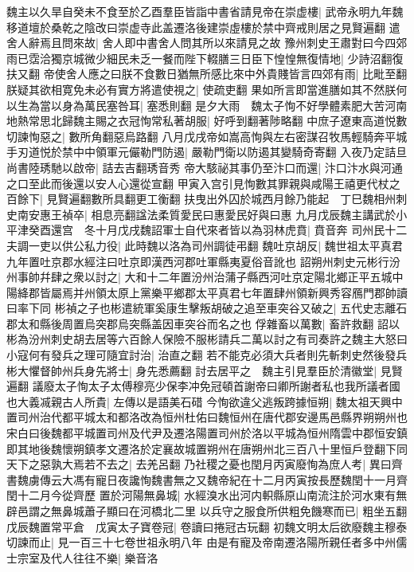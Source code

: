 魏主以久旱自癸未不食至於乙酉羣臣皆詣中書省請見帝在崇虚樓|{
	武帝永明九年魏移道壇於桑乾之陰改曰崇虚寺此盖遷洛後建崇虛樓於禁中齊戒則居之見賢遍翻}
遣舍人辭焉且問來故|{
	舍人即中書舍人問其所以來請見之故}
豫州刺史王肅對曰今四郊雨已霑洽獨京城微少細民未乏一餐而陛下輟膳三日臣下惶惶無復情地|{
	少詩沼翻復扶又翻}
帝使舍人應之曰朕不食數日猶無所感比來中外貴賤皆言四郊有雨|{
	比毗至翻}
朕疑其欲相寛免未必有實方將遣使視之|{
	使疏吏翻}
果如所言即當進膳如其不然朕何以生為當以身為萬民塞咎耳|{
	塞悉則翻}
是夕大雨　魏太子恂不好學體素肥大苦河南地熱常思北歸魏主賜之衣冠恂常私著胡服|{
	好呼到翻著陟略翻}
中庶子遼東高道悦數切諫恂惡之|{
	數所角翻惡烏路翻}
八月戊戌帝如嵩高恂與左右密謀召牧馬輕騎奔平城手刃道悦於禁中中領軍元儼勒門防遏|{
	嚴勒門衛以防遏其變騎奇寄翻}
入夜乃定詰旦尚書陸琇馳以啟帝|{
	詰去吉翻琇音秀}
帝大駭祕其事仍至汴口而還|{
	汴口汴水與河通之口至此而後還以安人心還從宣翻}
甲寅入宫引見恂數其罪親與咸陽王禧更代杖之百餘下|{
	見賢遍翻數所具翻更工衡翻}
扶曳出外囚於城西月餘乃能起　丁巳魏相州刺史南安惠王禎卒|{
	相息亮翻諡法柔質愛民曰惠愛民好與曰惠}
九月戊辰魏主講武於小平津癸酉還宫　冬十月戊戌魏詔軍士自代來者皆以為羽林虎賁|{
	賁音奔}
司州民十二夫調一吏以供公私力役|{
	此時魏以洛為司州調徒弔翻}
魏吐京胡反|{
	魏世祖太平真君九年置吐京郡水經注曰吐京即漢西河郡吐軍縣夷夏俗音訛也}
詔朔州刺史元彬行汾州事帥幷肆之衆以討之|{
	大和十二年置汾州治蒲子縣西河吐京定陽北鄉正平五城中陽絳郡皆屬焉并州領太原上黨樂平鄉郡太平真君七年置肆州領新興秀容鴈門郡帥讀曰率下同}
彬禎之子也彬遣統軍奚康生擊叛胡破之追至車突谷又破之|{
	五代史志離石郡太和縣後周置烏突郡烏突縣盖因車突谷而名之也}
俘雜畜以萬數|{
	畜許救翻}
詔以彬為汾州刺史胡去居等六百餘人保險不服彬請兵二萬以討之有司奏許之魏主大怒曰小寇何有發兵之理可隨宜討治|{
	治直之翻}
若不能克必須大兵者則先斬刺史然後發兵彬大懼督帥州兵身先將士|{
	身先悉薦翻}
討去居平之　魏主引見羣臣於清徽堂|{
	見賢遍翻}
議廢太子恂太子太傅穆亮少保李冲免冠頓首謝帝曰卿所謝者私也我所議者國也大義㓕親古人所貴|{
	左傳以是語美石碏}
今恂欲違父逃叛跨據恒朔|{
	魏太祖天興中置司州治代都平城太和都洛改為恒州杜佑曰魏恒州在唐代郡安邊馬邑縣界朔朔州也宋白曰後魏都平城置司州及代尹及遷洛陽置司州於洛以平城為恒州隋雲中郡恒安鎮即其地後魏懷朔鎮孝文遷洛於定襄故城置朔州在唐朔州北三百八十里恒戶登翻下同}
天下之惡孰大焉若不去之|{
	去羌呂翻}
乃社稷之憂也閏月丙寅廢恂為庶人考|{
	異曰齊書魏虜傳云大馮有寵日夜讒恂魏書無之又魏帝紀在十二月丙寅按長歷魏閏十一月齊閏十二月今從齊歷}
置於河陽無鼻城|{
	水經溴水出河内軹縣原山南流注於河水東有無辟邑謂之無鼻城蕭子顯曰在河橋北二里}
以兵守之服食所供粗免饑寒而已|{
	粗坐五翻}
戊辰魏置常平倉　戊寅太子寶卷冠|{
	卷讀曰捲冠古玩翻}
初魏文明太后欲廢魏主穆泰切諫而止|{
	見一百三十七卷世祖永明八年}
由是有寵及帝南遷洛陽所親任者多中州儒士宗室及代人往往不樂|{
	樂音洛}
